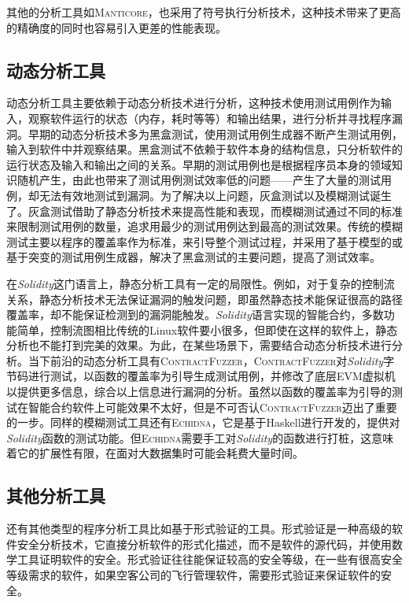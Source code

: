 其他的分析工具如\textsc{Manticore}，也采用了符号执行分析技术，这种技术带来了更高的精确度的同时也容易引入更差的性能表现。

\subsection{动态分析工具}

动态分析工具主要依赖于动态分析技术进行分析，这种技术使用测试用例作为输入，观察软件运行的状态（内存，耗时等等）和输出结果，进行分析并寻找程序漏洞。早期的动态分析技术多为黑盒测试，使用测试用例生成器不断产生测试用例，输入到软件中并观察结果。黑盒测试不依赖于软件本身的结构信息，只分析软件的运行状态及输入和输出之间的关系。早期的测试用例也是根据程序员本身的领域知识随机产生，由此也带来了测试用例测试效率低的问题——产生了大量的测试用例，却无法有效地测试到漏洞。为了解决以上问题，灰盒测试以及模糊测试诞生了。灰盒测试借助了静态分析技术来提高性能和表现，而模糊测试通过不同的标准来限制测试用例的数量，追求用最少的测试用例达到最高的测试效果。传统的模糊测试主要以程序的覆盖率作为标准，来引导整个测试过程，并采用了基于模型的或基于突变的测试用例生成器，解决了黑盒测试的主要问题，提高了测试效率。

在\emph{Solidity}这门语言上，静态分析工具有一定的局限性。例如，对于复杂的控制流关系，静态分析技术无法保证漏洞的触发问题，即虽然静态技术能保证很高的路径覆盖率，却不能保证检测到的漏洞能触发。\emph{Solidity}语言实现的智能合约，多数功能简单，控制流图相比传统的Linux软件要小很多，但即使在这样的软件上，静态分析也不能打到完美的效果。为此，在某些场景下，需要结合动态分析技术进行分析。当下前沿的动态分析工具有\textsc{ContractFuzzer}\cite{contractfuzzer}，\textsc{ContractFuzzer}对\emph{Solidity}字节码进行测试，以函数的覆盖率为引导生成测试用例，并修改了底层EVM虚拟机以提供更多信息，综合以上信息进行漏洞的分析。虽然以函数的覆盖率为引导的测试在智能合约软件上可能效果不太好，但是不可否认\textsc{ContractFuzzer}迈出了重要的一步。同样的模糊测试工具还有\textsc{Echidna}，它是基于Haskell进行开发的，提供对\emph{Solidity}函数的测试功能。但\textsc{Echidna}需要手工对\emph{Solidity}的函数进行打桩，这意味着它的扩展性有限，在面对大数据集时可能会耗费大量时间。

\subsection{其他分析工具}

还有其他类型的程序分析工具比如基于形式验证的工具。形式验证是一种高级的软件安全分析技术，它直接分析软件的形式化描述，而不是软件的源代码，并使用数学工具证明软件的安全。形式验证往往能保证较高的安全等级，在一些有很高安全等级需求的软件，如果空客公司的飞行管理软件，需要形式验证来保证软件的安全。


